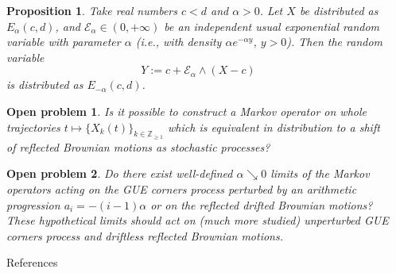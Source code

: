 \documentclass[english,final,t]{beamer}
\newtheorem{proposition}{Proposition}[section]
\newtheorem{question}{Open problem}
\begin{document}
\begin{frame}{}
\begin{columns}[t]
\begin{column}{.26\linewidth}
        \end{column}

        \begin{column}{.26\linewidth}
            \begin{proposition}
                \label{prop:elementary_swap}
                Take real numbers $c<d$ and $\alpha>0$. 
                Let $X$ be distributed as $E_\alpha(c,d)$,
                and $\mathscr{E}_\alpha\in(0,+\infty)$ be an independent usual
                exponential random variable with parameter $\alpha$
                (i.e., with density $\alpha e^{-\alpha y}$, $y>0$). Then
                the random variable
                \begin{equation}
                    \label{eq:Y_as_function_of_X_elementary_swap}
                    Y:=c+\mathcal{E}_\alpha\wedge(X-c)
                \end{equation}
                is distributed as $E_{-\alpha}(c,d)$.
            \end{proposition}
            \begin{question}
                Is it possible to construct a Markov operator 
                on whole trajectories $t\mapsto \{X_k(t) \}_{k\in \mathbb{Z}_{\ge1}}$
                which is equivalent in distribution to a shift of 
                reflected Brownian motions as stochastic processes?
            \end{question}
            \begin{question}
                Do there exist well-defined $\alpha\searrow0$ limits of the Markov operators acting 
                on the GUE corners process perturbed by an arithmetic progression $a_i=-(i-1)\alpha$
                or on the reflected drifted Brownian motions? 
                These hypothetical limits should act on (much more studied)
                unperturbed GUE corners process and driftless reflected Brownian motions.
            \end{question}
            \begin{block}{References}
                
                
            \end{block}
        \end{column}
    \end{columns}
\end{frame}
\end{document}

